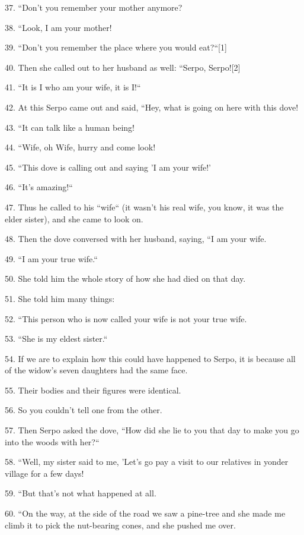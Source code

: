 {\LARGE{}37. ``Don't you remember your mother anymore? }

{\LARGE{}38. ``Look, I am your mother! }

{\LARGE{}39. ``Don't you remember the place where you would eat?``[1]
}

{\LARGE{}40. Then she called out to her husband as well: ``Serpo, Serpo![2]
}

{\LARGE{}41. ``It is I who am your wife, it is I!``}

{\LARGE{}42. At this Serpo came out and said, ``Hey, what is going on here
with this dove! }

{\LARGE{}43. ``It can talk like a human being! }

{\LARGE{}44. ``Wife, oh Wife, hurry and come look! }

{\LARGE{}45. ``This dove is calling out and saying 'I am your wife!' }

{\LARGE{}46. ``It's amazing!`` }

{\LARGE{}47. Thus he called to his ``wife`` (it wasn't his real
wife, you know, it was the elder sister), and she came to look on. }

{\LARGE{}48. Then the dove conversed with her husband, saying, ``I am your
wife. }

{\LARGE{}49. ``I am your true wife.`` }

{\LARGE{}50. She told him the whole story of how she had died on that day. }

{\LARGE{}51. She told him many things: }

{\LARGE{}52. ``This person who is now called your wife is not your true
wife. }

{\LARGE{}53. ``She is my eldest sister.``}

{\LARGE{}54. If we are to explain how this could have happened to Serpo, it is
because all of the widow's seven daughters had the same face. }

{\LARGE{}55. Their bodies and their figures were identical. }

{\LARGE{}56. So you couldn't tell one from the other.}

{\LARGE{}57. Then Serpo asked the dove, ``How did she lie to you that day
to make you go into the woods with her?``}

{\LARGE{}58.  ``Well, my sister said to me, 'Let's go pay a visit to our
relatives in yonder village for a few days!}

{\LARGE{}59.  ``But that's not what happened at all. }

{\LARGE{}60. ``On the way, at the side of the road we saw a pine-tree and
she made me climb it to pick the nut-bearing cones, and she pushed me over. }

